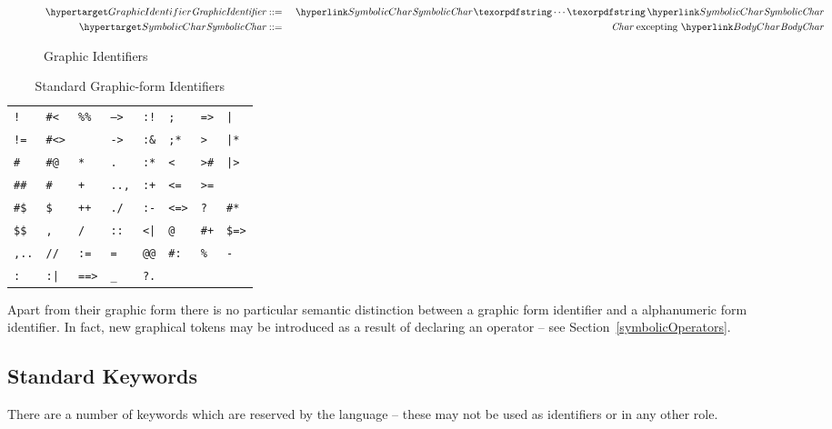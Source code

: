 \begin{figure}[htbp]
\begin{eqnarray*}
\ntDef{GraphicIdentifier}\ &\arrow&\ \ntRef{SymbolicChar}\sequence{}\ntRef{SymbolicChar}\\
\ntDef{SymbolicChar}\ &\arrow&\ \emph{Char}\ \text{{excepting}}\ \ntRef{BodyChar}
\end{eqnarray*}
\caption{Graphic Identifiers}
\label{graphicIdentifierFig}
\end{figure}


\begin{table}[h]
\begin{center}
\caption{Standard Graphic-form Identifiers}\label{standardGraphicsTable}
\begin{tabular}{|llllllll|}
\hline
\tt !&\tt \#<&\tt \%\%&\tt -->&\tt :!&\tt ;&\tt =>&\tt |\\
\tt !=&\tt \#<>&\tt *&\tt ->&\tt :\&&\tt ;*&\tt >&\tt |*\\
\tt \#&\tt \#@&\tt **&\tt .&\tt :*&\tt <&\tt >\#&\tt |>\\
\tt \#\#&\tt \#\tlda{}&\tt +&\tt ..,&\tt :+&\tt <=&\tt >=&\tt \tlda{}\\
\tt \#\$&\tt \$&\tt ++&\tt ./&\tt :-&\tt <=>&\tt ?&\tt \#*\\
\tt \$\$&\tt ,&\tt /&\tt ::&\tt <|&\tt @&\tt \#+&\tt \$=>\\
\tt ,..&\tt //&\tt :=&\tt =&\tt @@&\tt \#:&\tt \%&\tt -\\
\tt :&\tt :|&\tt ==>&\tt \_&\tt ?.&&&\\
\hline
\end{tabular}
\end{center}
\end{table}
\begin{aside}
Apart from their graphic form there is no particular semantic distinction between a graphic form identifier and a alphanumeric form identifier. In fact, new graphical tokens may be introduced as a result of declaring an operator -- see Section~\vref{symbolicOperators}.
\end{aside}

\subsection{Standard Keywords}
\label{keywords}
There are a number of keywords which are reserved by the language -- these may not be used as identifiers or in any other role.

